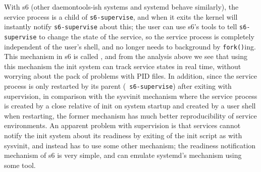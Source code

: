 With s6 (other daemontools-ish systems and systemd behave similarly), the
service process is a child of \verb|s6-supervise|, and when it exits the kernel
will instantly notify \verb|s6-supervise| about this; the user can use s6's
tools to tell \verb|s6-supervise| to change the state of the service, so the
service process is completely independent of the user's shell, and no longer
needs to background by \verb|fork()|ing.  This mechanism in s6 is called
, and from the analysis above we see that using
this mechanism the init system can track service states in real time, without
worrying about the pack of problems with PID files.  In addition, since the
service process is only restarted by its parent (\eg~\verb|s6-supervise|)
after exiting with supervision, in comparison with the sysvinit mechanism
where the service process is created by a close relative of init on system
startup and created by a user shell when restarting, the former mechanism
has much better reproducibility of service environments.  An apparent
problem with supervision is that services cannot notify the init system
about its readiness by exiting of the init script as with sysvinit,
and instead has to use some other mechanism; the readiness notification
mechanism of s6 is very simple, and can emulate
systemd's mechanism using some tool.

